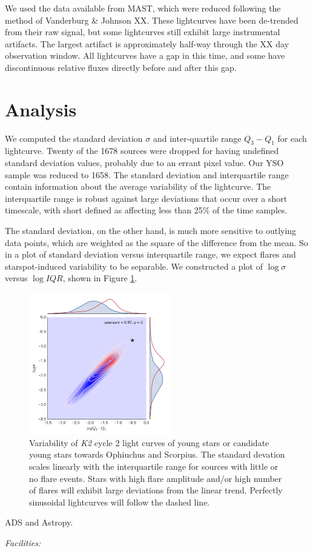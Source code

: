 \documentclass[onecolumn]{emulateapj}%
\begin{document}
We used the data available from MAST, which were reduced following the method of Vanderburg \& Johnson XX.  These lightcurves have been de-trended from their raw signal, but some lightcurves still exhibit large instrumental artifacts.  The largest artifact is approximately half-way through the XX day observation window.  All lightcurves have a gap in this time, and some have discontinuous relative fluxes directly before and after this gap.

\section{Analysis}
We computed the standard deviation $\sigma$ and inter-quartile range $Q_3-Q_1$ for each lightcurve.  Twenty of the 1678 sources were dropped for having undefined standard deviation values, probably due to an errant pixel value.  Our YSO sample was reduced to 1658.  The standard deviation and interquartile range contain information about the average variability of the lightcurve.  The interquartile range is robust against large deviations that occur over a short timescale, with short defined as affecting less than 25\% of the time samples.

The standard deviation, on the other hand, is much more sensitive to outlying data points, which are weighted as the square of the difference from the mean.  So in a plot of standard deviation versus interquartile range, we expect flares and starspot-induced variability to be separable.  We constructed a plot of $\log{\sigma}$ versus $\log{IQR}$, shown in Figure \ref{fig:k2_overview}.

\begin{figure}
	\centering
	\includegraphics[width=0.55\textwidth]{figures/K2_YSO_variability_overview.pdf} 
	\caption{Variability of \emph{K2} cycle 2 light curves of young stars or candidate young stars towards Ophiuchus and Scorpius.  The standard devation scales linearly with the interquartile range for sources with little or no flare events.  Stars with high flare amplitude and/or high number of flares will exhibit large deviations from the linear trend.  Perfectly sinusoidal lightcurves will follow the dashed line.  }
	\label{fig:k2_overview}
\end{figure}


\acknowledgements
ADS and Astropy.

{\it Facilities:} 

\clearpage



\end{document}
